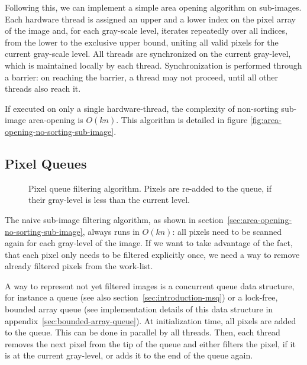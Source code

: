 Following this, we can implement a simple area opening algorithm on
sub-images. Each hardware thread is assigned an upper and a lower index on the
pixel array of the image and, for each gray-scale level, iterates repeatedly
over all indices, from the lower to the exclusive upper bound, uniting all valid
pixels for the current gray-scale level. All threads are synchronized on the
current gray-level, which is maintained locally by each thread. Synchronization
is performed through a barrier: on reaching the barrier, a thread may not
proceed, until all other threads also reach it.

If executed on only a single hardware-thread, the complexity of non-sorting
sub-image area-opening is $O(kn)$. This algorithm is detailed in figure
\ref{fig:area-opening-no-sorting-sub-image}.

\subsection{Pixel Queues}
\label{sec:area-opening-no-sorting-pixel-queues}

\begin{figure}
  \centering

  

  \caption[Pixel queue filtering algorithm.]{Pixel queue filtering
    algorithm. Pixels are re-added to the  queue, if their
    gray-level is less than the current level.}
  \label{fig:area-opening-no-sorting-pixel-queues}
\end{figure}

The naive sub-image filtering algorithm, as shown in
section~\ref{sec:area-opening-no-sorting-sub-image}, always runs in $O(kn)$: all
pixels need to be scanned again for each gray-level of the image. If we want to
take advantage of the fact, that each pixel only needs to be filtered explicitly
once, we need a way to remove already filtered pixels from the work-list.

A way to represent not yet filtered images is a concurrent queue data structure,
for instance a \citet{Michael1996Simple} queue (see also
section~\ref{sec:introduction-msq}) or a lock-free, bounded array queue (see
implementation details of this data structure in
appendix~\ref{sec:bounded-array-queue}). At initialization time, all pixels are
added to the queue. This can be done in parallel by all threads. Then, each
thread removes the next pixel from the tip of the queue and either filters the
pixel, if it is at the current gray-level, or adds it to the end of the queue
again.

